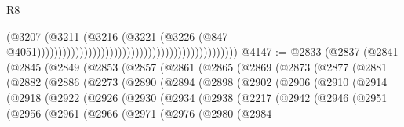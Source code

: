 \begin{lexlean}{R8}
\begin{coremodule}
                                                                                      (@3207
                                                                                        (@3211
                                                                                          (@3216
                                                                                            (@3221
                                                                                              (@3226
                                                                                                (@847
                                                                                                  @4051)))))))))))))))))))))))))))))))))))))))))))))))
@4147 := @2833
    (@2837
      (@2841
        (@2845
          (@2849
            (@2853
              (@2857
                (@2861
                  (@2865
                    (@2869
                      (@2873
                        (@2877
                          (@2881
                            (@2882
                              (@2886
                                (@2273
                                  (@2890
                                    (@2894
                                      (@2898
                                        (@2902
                                          (@2906
                                            (@2910
                                              (@2914
                                                (@2918
                                                  (@2922
                                                    (@2926
                                                      (@2930
                                                        (@2934
                                                          (@2938
                                                            (@2217
                                                              (@2942
                                                                (@2946
                                                                  (@2951
                                                                    (@2956
                                                                      (@2961
                                                                        (@2966
                                                                          (@2971
                                                                            (@2976
                                                                              (@2980
                                                                                (@2984

\end{coremodule}
\end{lexlean}
